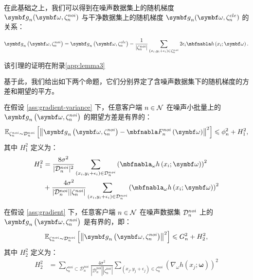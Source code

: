 在此基础之上，我们可以得到在噪声数据集上的随机梯度 $\gb_n(\omegab,\zetanoi_n)$ 与干净数据集上的随机梯度 $\gb_n(\omegab,\zetacle_n)$ 的关系：
\begin{lemma}[标签噪声下MSE的随机梯度]\label{lem:msegra}
    \begin{multline}\label{Gradient of clean loss}
\gb_n\left(\omegab,\zetanoi_n\right) %
=\gb_n\left(\omegab,\zetacle_n\right)
-\frac{1}{|\zetanoi_n|}\sum_{\left(x_i,y_i+\epsilon_i\right)\in \zetanoi_n}2\epsilon_i \nabla h\left(x_i;\boldsymbol{\omega}\right).
\end{multline}
\end{lemma}

\noindent 该引理的证明在附录\ref{app:lemma3}

基于此，我们给出如下两个命题，它们分别界定了含噪声数据集下的随机梯度的方差和期望的平方。

\begin{proposition}[均方差损失下含标签噪声的随机梯度的方差]\label{prop:variance-g mse}
在假设 \ref{ass:gradient-variance} 下，任意客户端 $n\in\mathcal{N}$ 在噪声小批量上的 $\gb_n\left(\omegab,\zetanoi_n\right)$ 的期望方差是有界的：
\begin{equation}\label{bounded-variance with noise}
     \mathbb{E}_{\zetanoi_n\sim \Dnoi_n}\left[\left\Vert \gb_n\left(\boldsymbol{\omega},\zetanoi_n\right) - \nabla \fnoi_n\left(\boldsymbol{\omega}\right) \right\Vert^2 \right] \leq \phi_n^2+H_1^2,
\end{equation}
其中 $H_1^2$ 定义为：
\begin{align}\label{eq:H}
    H_1^2 &= \frac{8\sigma^2}{|\mathcal{D}_n^{noi}|^2}\sum_{\left(x_{i},y_{i}+\epsilon_{i}\right)\in \mathcal{D}_n^{noi}}\left(
\nabla_\omega  h\left(x_{i};\boldsymbol{\omega}\right)\right)^2 \notag\\
    &+\frac{4\sigma^2}{|\mathcal{D}_n^{noi}||\zeta_n^{noi}|}\sum_{\left(x_{i},y_{i}+\epsilon_{i}\right)\in \mathcal{D}_n^{noi}}\left(
\nabla_\omega  h\left(x_{i};\boldsymbol{\omega}\right)\right)^2
\end{align}
\end{proposition}

\begin{proposition}[均方差损失下含标签噪声的随机梯度的平方的期望]\label{prp:square-g mse}
在假设 \ref{ass:gradient} 下，任意客户端 $n\in\mathcal{N}$ 在噪声数据集 $\mathcal{D}^{noi}_n$ 上的 $\gb_n\left(\omegab,\zetanoi_n\right)$ 是有界的，即：
\begin{equation}
    \mathbb{E}_{\zetanoi_n\sim \Dnoi_n}\left[\left\Vert \gb_n\left(\omegab, \zetanoi_n\right) \right\Vert^2\right] \leq G_n^2 + H_2^2,
\end{equation}
其中 $H_2^2$ 定义为：
\begin{align}\label{eq:H}
    H_2^2 &= \sum_{\zeta_n^{noi}\subset\mathcal{D}_n^{noi}} \frac{4\sigma^2}{|\mathcal{D}_n^{noi}||\zeta_n^{noi}|}\sum_{\left(x_{j},y_{j}+\epsilon_{j}\right)\in \zeta_n^{noi}}\left(
\nabla_\omega  h\left(x_{j};\boldsymbol{\omega}\right)\right)^2
\end{align}
\end{proposition}

